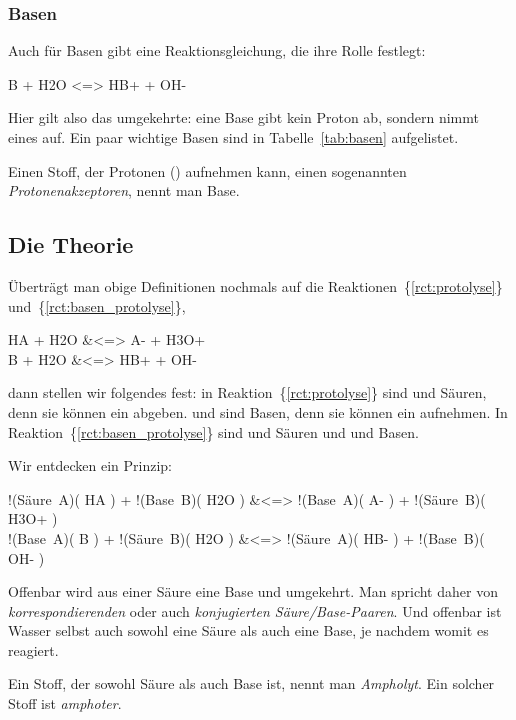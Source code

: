 \documentclass{scrartcl}
\newcommand*\rctref[1]{\{\ref{#1}\}}
\begin{document}
\subsubsection{Basen}
Auch für Basen gibt eine Reaktionsgleichung, die ihre Rolle festlegt:
\begin{reaction}
  B + H2O <=> HB+ + OH- \label{rct:basen_protolyse}
\end{reaction}
Hier gilt also das umgekehrte: eine Base gibt kein Proton ab, sondern nimmt
eines auf. Ein paar wichtige Basen sind in Tabelle~\ref{tab:basen} aufgelistet.
\begin{definition}
  Einen Stoff, der Protonen (\Hpl) aufnehmen kann, einen sogenannten
  \emph{Protonenakzeptoren}, nennt man Base.
\end{definition}

\subsection{Die Theorie}
Überträgt man obige Definitionen nochmals auf die
Reaktionen~\rctref{rct:protolyse} und~\rctref{rct:basen_protolyse},
\begin{reactions*}
  HA + H2O &<=> A- + H3O+ \\
  B  + H2O &<=> HB+ + OH-
\end{reactions*}
dann stellen wir folgendes fest: in Reaktion~\rctref{rct:protolyse} sind
 und  Säuren, denn sie können ein  abgeben.  
und  sind Basen, denn sie können ein  aufnehmen.  In
Reaktion~\rctref{rct:basen_protolyse} sind  und  Säuren und
 und  Basen.

Wir entdecken ein Prinzip:
\begin{reactions*}
       !(\color{red}Säure~A)( HA )  + !(\color{blue}Base~B)( H2O )
  &<=> !(\color{red}Base~A)( A- )   + !(\color{blue}Säure~B)( H3O+ ) \\
       !(\color{red}Base~A)( B )    + !(\color{blue}Säure~B)( H2O )
  &<=> !(\color{red}Säure~A)( HB- ) + !(\color{blue}Base~B)( OH- )
\end{reactions*}
Offenbar wird aus einer Säure eine Base und umgekehrt.  Man spricht daher von
\emph{korrespondierenden} oder auch \emph{konjugierten Säure/Base-Paaren}.
Und offenbar ist Wasser selbst auch sowohl eine Säure als auch eine Base, je
nachdem womit es reagiert.

\begin{definition}
  Ein Stoff, der sowohl Säure als auch Base ist, nennt man
  \emph{Ampholyt}. Ein solcher Stoff ist \emph{amphoter}.
\end{definition}
\end{document}

